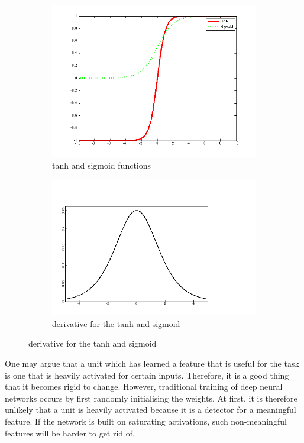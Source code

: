 \documentclass[a4paper,11pt]{article}
\begin{document}
\begin{figure}[h!]
	\centering
	\begin{subfigure}{.5\textwidth}
  		\centering
		\includegraphics[scale=0.4]{images/tanh_sigmoid.png}
		\caption{tanh and sigmoid functions}
	\end{subfigure}%
	\begin{subfigure}{.5\textwidth}
  		\centering
		\includegraphics[scale=0.4]{images/logistic_derivative.png}
		\caption{derivative for the tanh and sigmoid}
	\end{subfigure}
    \label{f27}
\end{figure}

One may argue that a unit which has learned a feature that is useful for the task is one that is heavily activated for certain inputs. Therefore, it is a good thing that it becomes rigid to change. However, traditional training of deep neural networks occurs by first randomly initialising the weights. At first, it is therefore unlikely that a unit is heavily activated because it is a detector for a meaningful feature. If the network is built on saturating activations, such non-meaningful features will be harder to get rid of. \\
\end{document}
